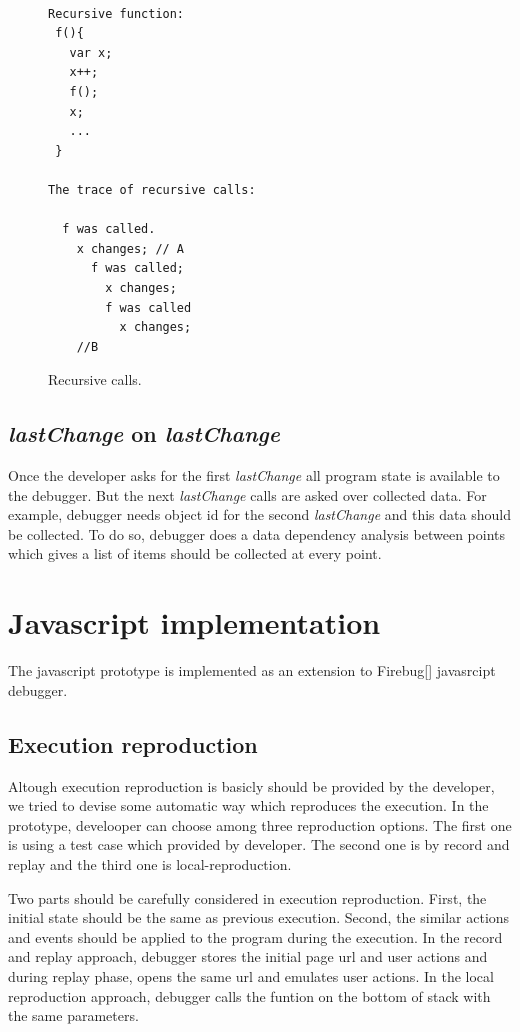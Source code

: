 \documentclass[preprint]{sigplanconf}
\begin{document}
\begin{figure}[htp]
\begin{verbatim}

Recursive function: 
 f(){
   var x;
   x++;
   f();
   x; 
   ...
 }

The trace of recursive calls:

  f was called.
    x changes; // A
      f was called;
        x changes;
        f was called
          x changes;
    //B 

\end{verbatim}
\caption{Recursive calls.}
\label{fig:recursive}
\end{figure}


\subsection{\textit{lastChange} on \textit{lastChange}}
Once the developer asks for the first \textit{lastChange} all program state is available to the debugger. But the next \textit{lastChange} calls are asked over collected data. For example, debugger needs object id for the second \textit{lastChange} and this data should be collected. To do so, debugger does a data dependency analysis between points which gives a list of items should be collected at every point.

\section{Javascript implementation}
The javascript prototype is implemented as an extension to Firebug[] javasrcipt debugger. 

\subsection{Execution reproduction}
Altough execution reproduction is basicly should be provided by the developer, we tried to devise some automatic way which reproduces the execution. In the prototype, develooper can choose among three reproduction options. The first one is using a test case which provided by developer. The second one is by record and replay and the third one is local-reproduction.

Two parts should be carefully considered in execution reproduction. First, the initial state should be the same as previous execution. Second, the similar actions and events should be applied to the program during the execution. In the record and replay approach, debugger stores the initial page url and user actions and during replay phase, opens the same url and emulates user actions. 
In the local reproduction approach, debugger calls the funtion on the bottom of stack with the same parameters.
\end{document}
